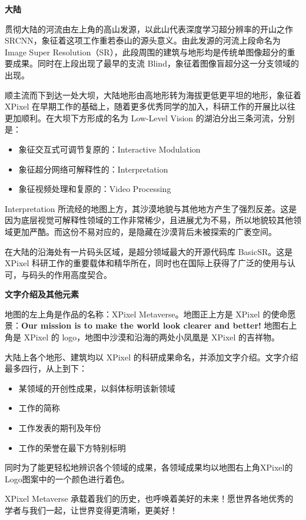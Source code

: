 \documentclass[../main.tex]{subfiles}
\begin{document}
\textbf{大陆}

贯彻大陆的河流由左上角的高山发源，以此山代表深度学习超分辨率的开山之作 SRCNN，象征着这项工作重若泰山的源头意义。由此发源的河流上段命名为 Image Super Resolution（SR），此段周围的建筑与地形均是传统单图像超分的重要成果。同时在上段出现了最早的支流 Blind，象征着图像盲超分这一分支领域的出现。

顺主流而下到达一处大坝，大陆地形由高地形转为海拔更低更平坦的地形，象征着 XPixel 在早期工作的基础上，随着更多优秀同学的加入，科研工作的开展比以往更加顺利。在大坝下方形成的名为 Low-Level Vision 的湖泊分出三条河流，分别是：
\begin{itemize}
    \item 象征交互式可调节复原的：Interactive Modulation
    \item 象征超分网络可解释性的：Interpretation
    \item 象征视频处理和复原的：Video Processing
\end{itemize}

Interpretation 所流经的地图上方，其沙漠地貌与其他地方产生了强烈反差。这是因为底层视觉可解释性领域的工作非常稀少，且进展尤为不易，所以地貌较其他领域更加严酷。而这份不易对应的，是隐藏在沙漠背后未被探索的广袤空间。

在大陆的沿海处有一片码头区域，是超分领域最大的开源代码库 BasicSR。这是 XPixel 科研工作的重要载体和精华所在，同时也在国际上获得了广泛的使用与认可，与码头的作用高度契合。

\textbf{文字介绍及其他元素}

地图的左上角是作品的名称：XPixel Metaverse。地图正上方是 XPixel 的使命愿景：\textbf{Our mission is to make the world look clearer and better!} 地图右上角是 XPixel 的 logo，地图中沙漠和沿海的两处小凤凰是 XPixel 的吉祥物。

大陆上各个地形、建筑均以 XPixel 的科研成果命名，并添加文字介绍。文字介绍最多四行，从上到下：

\begin{itemize}
    \item 某领域的开创性成果，以斜体标明该新领域
    \item 工作的简称
    \item 工作发表的期刊及年份
    \item 工作的荣誉在最下方特别标明
\end{itemize}

同时为了能更轻松地辨识各个领域的成果，各领域成果均以地图右上角XPixel的Logo图案中的一个颜色进行着色。

\vspace{0.5cm}
XPixel Metaverse 承载着我们的历史，也呼唤着美好的未来！愿世界各地优秀的学者与我们一起，让世界变得更清晰，更美好！
\end{document}
